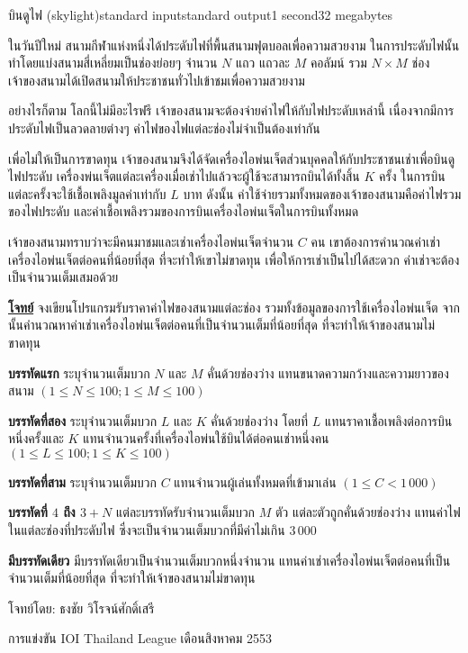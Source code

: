 \documentclass[11pt,a4paper]{article}
\begin{document}
\begin{problem}{บินดูไฟ (skylight)}{standard input}{standard output}{1 second}{32 megabytes}

ในวันปีใหม่ สนามกีฬาแห่งหนึ่งได้ประดับไฟที่พื้นสนามฟุตบอลเพื่อความสวยงาม ในการประดับไฟนั้นทำโดยแบ่งสนามสี่เหลี่ยมเป็นช่องย่อยๆ จำนวน $N$ แถว แถวละ $M$ คอลัมน์ รวม $N\times M$ ช่อง เจ้าของสนามได้เปิดสนามให้ประชาชนทั่วไปเข้าชมเพื่อความสวยงาม

อย่างไรก็ตาม โลกนี้ไม่มีอะไรฟรี เจ้าของสนามจะต้องจ่ายค่าไฟให้กับไฟประดับเหล่านี้ เนื่องจากมีการประดับไฟเป็นลวดลายต่างๆ ค่าไฟของไฟแต่ละช่องไม่จำเป็นต้องเท่ากัน

เพื่อไม่ให้เป็นการขาดทุน เจ้าของสนามจึงได้จัดเครื่องไอพ่นเจ็ตส่วนบุคคลให้กับประชาชนเช่าเพื่อบินดูไฟประดับ เครื่องพ่นเจ็ตแต่ละเครื่องเมื่อเช่าไปแล้วจะผู้ใช้จะสามารถบินได้ทั้งสิ้น $K$ ครั้ง ในการบินแต่ละครั้งจะใช้เชื้อเพลิงมูลค่าเท่ากับ $L$ บาท ดังนั้น ค่าใช้จ่ายรวมทั้งหมดของเจ้าของสนามคือค่าไฟรวมของไฟประดับ และค่าเชื้อเพลิงรวมของการบินเครื่องไอพ่นเจ็ตในการบินทั้งหมด

เจ้าของสนามทราบว่าจะมีคนมาชมและเช่าเครื่องไอพ่นเจ็ตจำนวน $C$ คน เขาต้องการคำนวณค่าเช่าเครื่องไอพ่นเจ็ตต่อคนที่น้อยที่สุด ที่จะทำให้เขาไม่ขาดทุน เพื่อให้การเช่าเป็นไปได้สะดวก ค่าเช่าจะต้องเป็นจำนวนเต็มเสมอด้วย

\underline{\textbf{โจทย์}} จงเขียนโปรแกรมรับราคาค่าไฟของสนามแต่ละช่อง รวมทั้งข้อมูลของการใช้เครื่องไอพ่นเจ็ต จากนั้นคำนวณหาค่าเช่าเครื่องไอพ่นเจ็ตต่อคนที่เป็นจำนวนเต็มที่น้อยที่สุด ที่จะทำให้เจ้าของสนามไม่ขาดทุน

\InputFile

\textbf{บรรทัดแรก} ระบุจำนวนเต็มบวก $N$ และ $M$ คั่นด้วยช่องว่าง แทนขนาดความกว้างและความยาวของสนาม $(1 \leq N \leq 100; 1 \leq M \leq 100)$

\textbf{บรรทัดที่สอง} ระบุจำนวนเต็มบวก $L$ และ $K$ คั่นด้วยช่องว่าง โดยที่ $L$ แทนราคาเชื้อเพลิงต่อการบินหนึ่งครั้งและ $K$ แทนจำนวนครั้งที่เครื่องไอพ่นใช้บินได้ต่อคนเช่าหนึ่งคน $(1 \leq L \leq 100; 1 \leq K \leq 100)$

\textbf{บรรทัดที่สาม} ระบุจำนวนเต็มบวก $C$ แทนจำนวนผู้เล่นทั้งหมดที่เข้ามาเล่น $(1 \leq C < 1\,000)$

\textbf{บรรทัดที่ $4$ ถึง $3+N$} แต่ละบรรทัดรับจำนวนเต็มบวก $M$ ตัว แต่ละตัวถูกคั่นด้วยช่องว่าง แทนค่าไฟในแต่ละช่องที่ประดับไฟ ซึ่งจะเป็นจำนวนเต็มบวกที่มีค่าไม่เกิน $3\,000$

\OutputFile

\textbf{มีบรรทัดเดียว} มีบรรทัดเดียวเป็นจำนวนเต็มบวกหนึ่งจำนวน แทนค่าเช่าเครื่องไอพ่นเจ็ตต่อคนที่เป็นจำนวนเต็มที่น้อยที่สุด  ที่จะทำให้เจ้าของสนามไม่ขาดทุน

\Examples

\begin{example}
%
%
\end{example}

\Source

โจทย์โดย: ธงชัย วิโรจน์ศักดิ์เสรี

การแข่งขัน IOI Thailand League เดือนสิงหาคม 2553

\end{problem}
\end{document}

